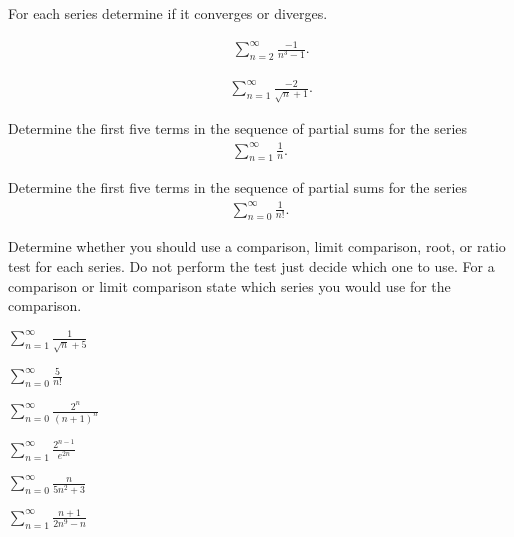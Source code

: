 
\begin{problem}
\item For each series determine if it converges or diverges.
  \begin{subproblem}
  \item
    \begin{eqnarray*}
      & & \sum^\infty_{n=2} \frac{-1}{n^3-1}.
    \end{eqnarray*}
    \vfill
  \item
    \begin{eqnarray*}
      & & \sum^\infty_{n=1} \frac{-2}{\sqrt{n}+1}.
    \end{eqnarray*}
    \vfill
  \end{subproblem}
\end{problem}


\begin{problem}
  \item Determine the first five terms in the sequence of partial sums for the series
  \begin{eqnarray*}
    \sum^\infty_{n=1} \frac{1}{n}.
  \end{eqnarray*}
  \vfill

  \item Determine the first five terms in the sequence of partial sums for the series
  \begin{eqnarray*}
    \sum^\infty_{n=0} \frac{1}{n!}.
  \end{eqnarray*}
  \vfill

  \clearpage

\item Determine whether you should use a comparison, limit comparison,
  root, or ratio test for each series. Do not perform the test just decide
  which one to use. For a comparison or limit comparison state which
  series you would use for the comparison.
  \begin{subproblem}
    \item $\sum_{n=1}^\infty \frac{1}{\sqrt{n}+5}$
      \vfill
    \item $\sum_{n=0}^\infty \frac{5}{n!}$
      \vfill
    \item $\sum_{n=0}^\infty \frac{2^n}{(n+1)^n} $
      \vfill
      \clearpage
    \item $\sum_{n=1}^\infty \frac{2^{n-1}}{e^{2n}}$
      \vfill
    \item $\sum_{n=0}^\infty \frac{n}{5n^2+3} $
      \vfill
    \item $\sum_{n=1}^\infty \frac{n+1}{2n^9-n}$
      \vfill
  \end{subproblem}
\end{problem}


